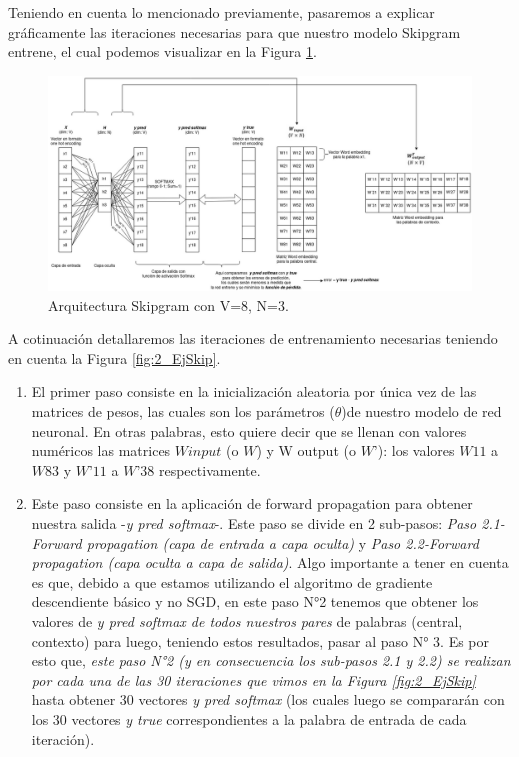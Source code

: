 \documentclass[12pt,a4paper]{article}
\begin{document}
\begin{sloppypar}
Teniendo en cuenta lo mencionado previamente, pasaremos a explicar gráficamente las iteraciones necesarias para que nuestro modelo Skipgram entrene, el cual podemos visualizar en la  Figura \ref{fig:4_EjSkip}.

\begin{figure}[H]    %
\centering
\includegraphics[width=1\textwidth]{images/Ejemplo_Skipgram/4_EjSkip.png}
\caption{Arquitectura Skipgram con V=8, N=3.} 
\label{fig:4_EjSkip}
\end{figure}

A cotinuación detallaremos las iteraciones de entrenamiento necesarias teniendo en cuenta la Figura \ref{fig:2_EjSkip}. 

\begin{enumerate}
      
\item El primer paso consiste en la inicialización aleatoria por única vez de las matrices de pesos, las cuales son los parámetros ($\theta$)de nuestro modelo de red neuronal. En otras palabras, esto quiere decir que se llenan con valores numéricos las matrices $W input$ (o $W$) y W output (o $W’$): los valores $W11$ a $W83$ y $W’11$ a $W’38$ respectivamente.
\item Este paso consiste en la aplicación de forward propagation para obtener nuestra salida -\textit{y pred softmax}-. Este paso se divide en 2 sub-pasos: \textit{Paso 2.1-Forward propagation (capa de entrada a capa oculta)} y \textit{Paso 2.2-Forward propagation (capa oculta a capa de salida)}.
Algo importante a tener en cuenta es que, debido a que estamos utilizando el algoritmo de gradiente descendiente básico y no SGD, en este paso N°2 tenemos que obtener los valores de \textit{y pred softmax de todos nuestros pares} de palabras (central, contexto) para luego, teniendo estos resultados, pasar al paso N° 3. Es por esto que, \textit{este paso N°2 (y en consecuencia los sub-pasos 2.1 y 2.2) se realizan por cada una de las 30 iteraciones que vimos en la Figura \ref{fig:2_EjSkip} } hasta obtener 30 vectores \textit{y pred softmax} (los cuales luego se compararán con los 30 vectores \textit{y true} correspondientes a la palabra de entrada de cada iteración).
      \begin{itemize}
      

\end{itemize}
\end{enumerate}
\end{sloppypar}
\end{document}
